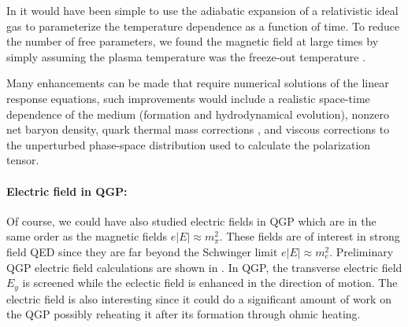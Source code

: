 In \cite{Grayson:2022asf} it would have been simple to use the adiabatic expansion of a relativistic ideal gas \cite{Bjorken:1982qr} to parameterize the temperature dependence as a function of time. To reduce the number of free parameters, we found the magnetic field at large times by simply assuming the plasma temperature was the freeze-out temperature .

Many enhancements can be made that require numerical solutions of the linear response equations, such improvements would include a realistic space-time dependence of the medium (formation and hydrodynamical evolution), nonzero net baryon density, quark thermal mass corrections \cite{Weldon:1982bn}, and viscous corrections to the unperturbed phase-space distribution used to calculate the polarization tensor.

\paragraph{Electric field in QGP:} Of course, we could have also studied electric fields in QGP which are in the same order as the magnetic fields $e|E| \approx m_\pi^2$. These fields are of interest in strong field QED since they are far beyond the Schwinger limit $e|E| \approx m_e^2$. Preliminary QGP electric field calculations are shown in . In QGP, the transverse electric field $E_y$ is screened while the eclectic field is enhanced in the direction of motion. The electric field is also interesting since it could do a significant amount of work on the QGP possibly reheating it after its formation through ohmic heating. 

